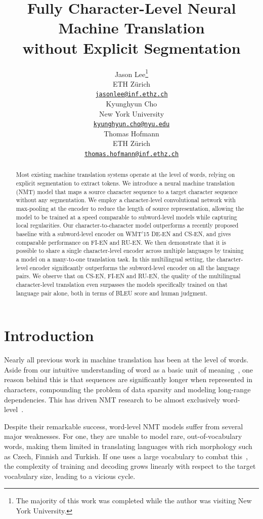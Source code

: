 \documentclass[11pt,letterpaper]{article}
\title{Fully Character-Level Neural Machine Translation \\ without Explicit Segmentation}
\author{Jason Lee\thanks{\hspace{1.5mm}The majority of this work was completed while the author was visiting New York University.}\\
  ETH Z\"urich \\
  {\tt\small\href{jasonlee@inf.ethz.ch}{jasonlee@inf.ethz.ch}} \\ \And
  Kyunghyun Cho \\
  New York University \\
  {\tt\small\href{kyunghyun.cho@nyu.edu}{kyunghyun.cho@nyu.edu}} \\ \And
  Thomas Hofmann \\
  ETH Z\"urich \\
  {\tt\small\href{thomas.hofmann@inf.ethz.ch}{thomas.hofmann@inf.ethz.ch}}
  }
\date{}
\begin{document}
\maketitle
\begin{abstract}
    Most existing machine translation systems operate at the level of words, relying on explicit segmentation to extract tokens. We introduce a neural machine translation (NMT) model that maps a source character sequence to a target character sequence without any segmentation. We employ a character-level convolutional network with max-pooling at the encoder to reduce the length of source representation, allowing the model to be trained at a speed comparable to subword-level models while capturing local regularities. Our character-to-character model outperforms a recently proposed baseline with a subword-level encoder on WMT'15 DE-EN and CS-EN, and gives comparable performance on FI-EN and RU-EN. We then demonstrate that it is possible to share a single character-level encoder across multiple languages by training a model on a many-to-one translation task. In this multilingual setting, the character-level encoder significantly outperforms the subword-level encoder on all the language pairs. We observe that on CS-EN, FI-EN and RU-EN, the quality of the multilingual character-level translation even surpasses the models specifically trained on that language pair alone, both in terms of BLEU score and human judgment.
\end{abstract}


\section{Introduction}\label{sec:intro}
Nearly all previous work in machine translation has been at the level of words. Aside from our intuitive understanding of word as a basic unit of meaning~\cite{Jackendoff:90}, one reason behind this is that sequences are significantly longer when represented in characters, compounding the problem of data sparsity and modeling long-range dependencies. This has driven NMT research to be almost exclusively word-level~\cite{Bahdanau:15,Sutskever:14}.

Despite their remarkable success, word-level NMT models suffer from several major weaknesses. For one, they are unable to model rare, out-of-vocabulary words, making them limited in translating languages with rich morphology such as Czech, Finnish and Turkish. If one uses a large vocabulary to combat this~\cite{Jean:15}, the complexity of training and decoding grows linearly with respect to the target vocabulary size, leading to a vicious cycle.
\end{document}

